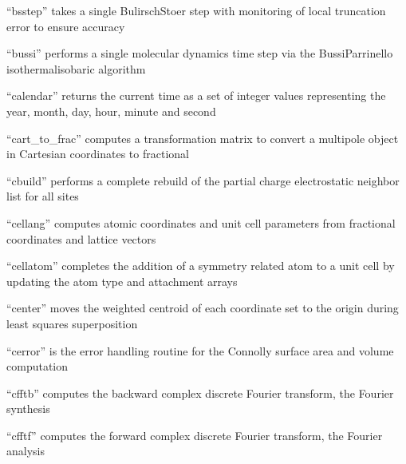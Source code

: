\documentclass[letterpaper,11pt,english]{sphinxmanual}
\begin{document}

“bsstep” takes a single Bulirsch\sphinxhyphen{}Stoer step with monitoring
of local truncation error to ensure accuracy


“bussi” performs a single molecular dynamics time step via
the Bussi\sphinxhyphen{}Parrinello isothermal\sphinxhyphen{}isobaric algorithm


“calendar” returns the current time as a set of integer values
representing the year, month, day, hour, minute and second


“cart\_to\_frac” computes a transformation matrix to convert
a multipole object in Cartesian coordinates to fractional


“cbuild” performs a complete rebuild of the partial charge
electrostatic neighbor list for all sites


“cellang” computes atomic coordinates and unit cell parameters
from fractional coordinates and lattice vectors


“cellatom” completes the addition of a symmetry related atom
to a unit cell by updating the atom type and attachment arrays


“center” moves the weighted centroid of each coordinate
set to the origin during least squares superposition


“cerror” is the error handling routine for the Connolly
surface area and volume computation


“cfftb” computes the backward complex discrete Fourier
transform, the Fourier synthesis



“cfftf” computes the forward complex discrete Fourier
transform, the Fourier analysis
\end{document}
